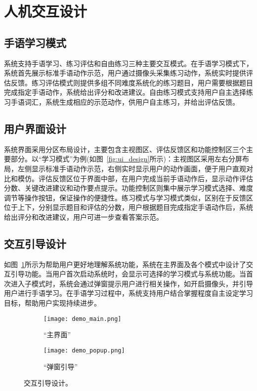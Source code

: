 \section{人机交互设计}

\subsection{手语学习模式}
系统支持手语学习、练习评估和自由练习三种主要交互模式。在手语学习模式下，系统首先展示标准手语动作示范，用户通过摄像头采集练习动作，系统实时提供评估反馈。练习评估模式则提供多组不同难度系统化的练习题目，用户需要根据题目完成指定手语动作，系统给出评分和改进建议。自由练习模式支持用户自主选择练习手语词汇，系统生成相应的示范动作，供用户自主练习，并给出评估反馈。

\subsection{用户界面设计}
系统界面采用分区布局设计，主要包含主视图区、评估反馈区和功能控制区三个主要部分。以“学习模式”为例(如图~\ref{fig:ui_design}所示)：主视图区采用左右分屏布局，左侧显示标准手语动作示范，右侧实时显示用户的动作画面，便于用户直观对比和模仿。评估反馈区位于界面中部，在用户完成当前手语动作后，显示动作评估分数、关键改进建议和动作要点提示。功能控制区则集中展示学习模式选择、难度调节等操作按钮，保证操作的便捷性。练习模式与学习模式类似，区别在于反馈区位于上下，分别显示题目和评估的分数，用户根据题目完成指定手语动作后，系统给出评分和改进建议，用户可进一步查看答案示范。



\subsection{交互引导设计}
如图~\ref{fig:ui_interaction}所示为帮助用户更好地理解系统功能，系统在主界面及各个模式中设计了交互引导功能。当用户首次启动系统时，会显示可选择的学习模式与系统功能。当首次进入子模式时，系统会通过弹窗提示用户进行相关操作，如开启摄像头，并引导用户进行手语学习。在手语学习过程中，系统支持用户结合掌握程度自主设定学习目标，帮助用户实现持续进步。

\begin{figure}
    \centering
    \begin{subfigure}[b]{0.48\linewidth}
        \centering
        \texttt{[image: demo\_main.png]}
        \caption{“主界面”}
    \end{subfigure}
    \hfill
    \begin{subfigure}[b]{0.48\linewidth}
        \centering
        \texttt{[image: demo\_popup.png]}
        \caption{“弹窗引导”}
    \end{subfigure}
    \caption{交互引导设计。}
    \label{fig:ui_interaction}
  \end{figure}

